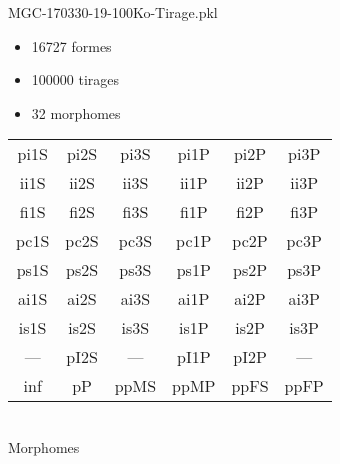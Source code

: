 MGC-170330-19-100Ko-Tirage.pkl
\begin{itemize}
\item 16727 formes
\item 100000 tirages
\item 32 morphomes
\end{itemize}
\begin{center}
\begin{tabular}{cccccc}
\hline
\cellcolor{white}pi1S & \cellcolor{orange}pi2S & \cellcolor{orange}pi3S & \cellcolor{white}pi1P & \cellcolor{white}pi2P & \cellcolor{white}pi3P\\
\cellcolor{brown}ii1S & \cellcolor{brown}ii2S & \cellcolor{brown}ii3S & \cellcolor{white}ii1P & \cellcolor{white}ii2P & \cellcolor{brown}ii3P\\
\cellcolor{yellow}fi1S & \cellcolor{lime}fi2S & \cellcolor{lime}fi3S & \cellcolor{white}fi1P & \cellcolor{white}fi2P & \cellcolor{white}fi3P\\
\cellcolor{yellow}pc1S & \cellcolor{yellow}pc2S & \cellcolor{yellow}pc3S & \cellcolor{white}pc1P & \cellcolor{white}pc2P & \cellcolor{yellow}pc3P\\
\cellcolor{teal}ps1S & \cellcolor{teal}ps2S & \cellcolor{teal}ps3S & \cellcolor{white}ps1P & \cellcolor{white}ps2P & \cellcolor{teal}ps3P\\
\cellcolor{white}ai1S & \cellcolor{lightgray}ai2S & \cellcolor{lightgray}ai3S & \cellcolor{white}ai1P & \cellcolor{pink}ai2P & \cellcolor{white}ai3P\\
\cellcolor{pink}is1S & \cellcolor{pink}is2S & \cellcolor{lightgray}is3S & \cellcolor{pink}is1P & \cellcolor{black}is2P & \cellcolor{pink}is3P\\
--- & \cellcolor{white}pI2S & --- & \cellcolor{white}pI1P & \cellcolor{white}pI2P & ---\\
\cellcolor{white}inf & \cellcolor{white}pP & \cellcolor{white}ppMS & \cellcolor{white}ppMP & \cellcolor{white}ppFS & \cellcolor{white}ppFP\\
\hline
\end{tabular}\\
Morphomes
\end{center}
\bigskip
